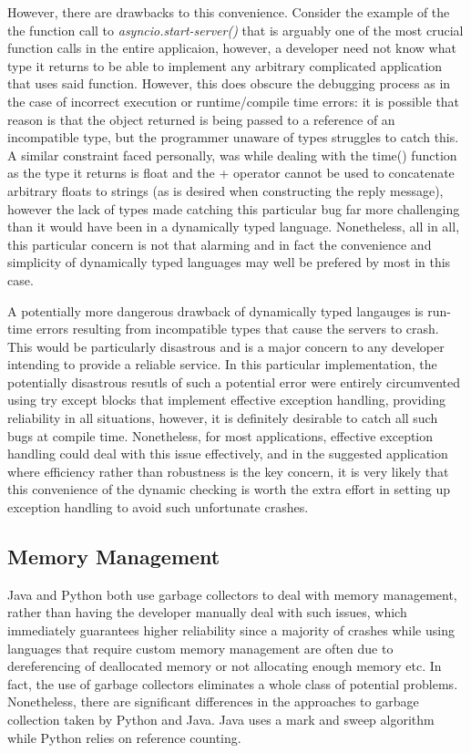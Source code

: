 \noindent However, there are drawbacks to this convenience. Consider the example of the the function call to \emph{asyncio.start-server()} that is arguably one of the most crucial function calls in the entire applicaion, however, a developer need not know what type it returns to be able to implement any arbitrary complicated application that uses said function. However, this does obscure the debugging process as in the case of incorrect execution or runtime/compile time errors: it is possible that reason is that the object returned is being passed to a reference of an incompatible type, but the programmer unaware of types struggles to catch this. A similar constraint faced personally, was while dealing with the time() function as the type it returns is float and the + operator cannot be used to concatenate arbitrary floats to strings (as is desired when constructing the reply message), however the lack of types made catching this particular bug far more challenging than it would have been in a dynamically typed language. Nonetheless, all in all, this particular concern is not that alarming and in fact the convenience and simplicity of dynamically typed languages may well be prefered by most in this case. \newline

\noindent A potentially more dangerous drawback of dynamically typed langauges is run-time errors resulting from incompatible types that cause the servers to crash. This would be particularly disastrous and is a major concern to any developer intending to provide a reliable service. In this particular implementation, the potentially disastrous resutls of such a potential error were entirely circumvented using try except blocks that implement effective exception handling, providing reliability in all situations, however, it is definitely desirable to catch all such bugs at compile time. Nonetheless, for most applications, effective exception handling could deal with this issue effectively, and in the suggested application where efficiency rather than robustness is the key concern, it is very likely that this convenience of the dynamic checking is worth the extra effort in setting up exception handling to avoid such unfortunate crashes. 

\subsection{Memory Management}
Java and Python both use garbage collectors to deal with memory management, rather than having the developer manually deal with such issues, which immediately guarantees higher reliability since a majority of crashes while using languages that require custom memory management are often due to dereferencing of deallocated memory or not allocating enough memory etc. In fact, the use of garbage collectors eliminates a whole class of potential problems. Nonetheless, there are significant differences in the approaches to garbage collection taken by Python and Java. Java uses a mark and sweep algorithm while Python relies on reference counting. \newline

